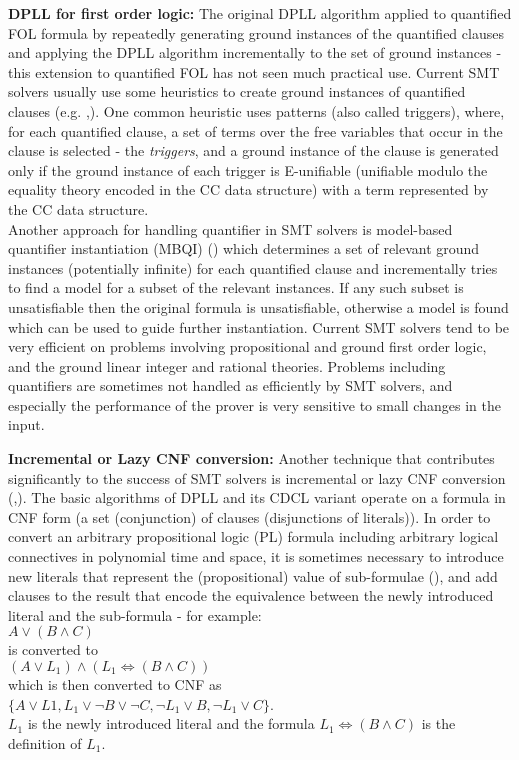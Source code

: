 \textbf{DPLL for first order logic:}
The original DPLL algorithm applied to quantified FOL formula by repeatedly generating ground instances of the quantified clauses and applying the DPLL algorithm incrementally to the set of ground instances - this extension to quantified FOL has not seen much practical use. Current SMT solvers usually use some heuristics to create ground instances of quantified clauses (e.g. \cite{DBLP:conf/cade/ReynoldsTGKDB13},\cite{DBLP:conf/cav/GeM09}). One common heuristic uses patterns (also called triggers), where, for each quantified clause, a set of terms over the free variables that occur in the clause is selected - the \textit{triggers}, and a ground instance of the clause is generated only if the ground instance of each trigger is E-unifiable (unifiable modulo the equality theory encoded in the CC data structure) with a term represented by the CC data structure.\\
Another approach for handling quantifier in SMT solvers is model-based quantifier instantiation (MBQI) (\cite{DBLP:conf/cav/GeM09}) which determines a set of relevant ground instances (potentially infinite) for each quantified clause and incrementally tries to find a model for a subset of the relevant instances.
If any such subset is unsatisfiable then the original formula is unsatisfiable, otherwise a model is found which can be used to guide further instantiation. 
Current SMT solvers tend to be very efficient on problems involving propositional and ground first order logic, and the ground linear integer and rational theories. Problems including quantifiers are sometimes not handled as efficiently by SMT solvers, and especially the performance of the prover is very sensitive to small changes in the input. 

\textbf{Incremental or Lazy CNF conversion:}
Another technique that contributes significantly to the success of SMT solvers is incremental or lazy CNF conversion (\cite{DBLP:conf/cav/BarrettDS02},\cite{DBLP:conf/cav/FlanaganJOS03}).
The basic algorithms of DPLL and its CDCL variant operate on a formula in CNF form (a set (conjunction) of clauses (disjunctions of literals)). In order to convert an arbitrary propositional logic (PL) formula including arbitrary logical connectives in polynomial time and space, it is sometimes necessary to introduce new literals that represent the (propositional) value of sub-formulae (\cite{Baaz2001273}), and add clauses to the result that encode the equivalence between the newly introduced literal and the sub-formula - for example: \\
$A \lor (B \land C)$ \\
is converted to\\
$(A \lor L_1) \land (L_1 \Leftrightarrow (B \land C))$\\
which is then converted to CNF as\\
$\{A \lor L1, L_1 \lor \lnot B \lor \lnot C, \lnot L_1 \lor B, \lnot L_1 \lor C\}$.\\
$L_1$ is the newly introduced literal and the formula $L_1 \Leftrightarrow (B \land C)$ is the definition of $L_1$.

